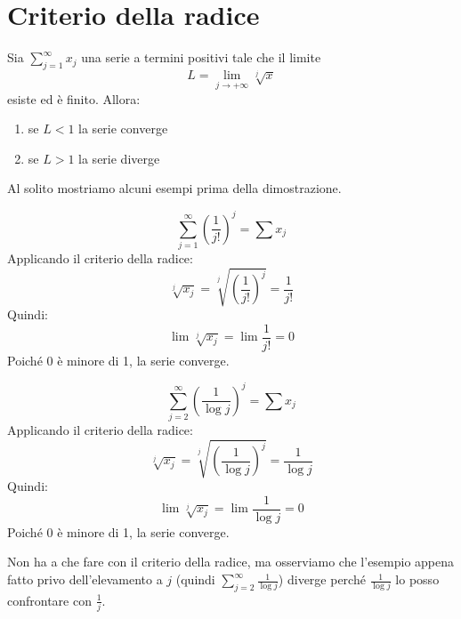 \section{Criterio della radice}
\begin{theorem}
Sia $\sum_{j=1}^\infty x_j$ una serie a termini positivi tale che il limite
\begin{equation*}
L = \lim_{j \to +\infty} \sqrt[j]{x}
\end{equation*}
esiste ed è finito. Allora:
\begin{enumerate}
\item se $L < 1$ la serie converge
\item se $L > 1$ la serie diverge
\end{enumerate}
\end{theorem}

Al solito mostriamo alcuni esempi prima della dimostrazione.
\begin{example}
\begin{equation*}
\sum_{j=1}^\infty \left(\frac{1}{j!}\right)^j = \sum x_j
\end{equation*}
Applicando il criterio della radice:
\begin{equation*}
\sqrt[j]{x_j} = \sqrt[j]{\left(\frac{1}{j!}\right)^j} = \frac{1}{j!}
\end{equation*}
Quindi:
\begin{equation*}
\lim \sqrt[j]{x_j} = \lim \frac{1}{j!} = 0
\end{equation*}
Poiché 0 è minore di 1, la serie converge.
\end{example}

\begin{example}
\begin{equation*}
\sum_{j=2}^\infty \left(\frac{1}{\log j}\right)^j = \sum x_j
\end{equation*}
Applicando il criterio della radice:
\begin{equation*}
\sqrt[j]{x_j} = \sqrt[j]{\left(\frac{1}{\log j}\right)^j} = \frac{1}{\log j}
\end{equation*}
Quindi:
\begin{equation*}
\lim \sqrt[j]{x_j} = \lim \frac{1}{\log j} = 0
\end{equation*}
Poiché 0 è minore di 1, la serie converge.
\end{example}

Non ha a che fare con il criterio della radice, ma osserviamo che l'esempio appena fatto privo dell'elevamento a $j$ (quindi $\sum_{j=2}^\infty \frac{1}{\log j}$) diverge perché $\frac{1}{\log j}$ lo posso confrontare con $\frac{1}{j}$.

